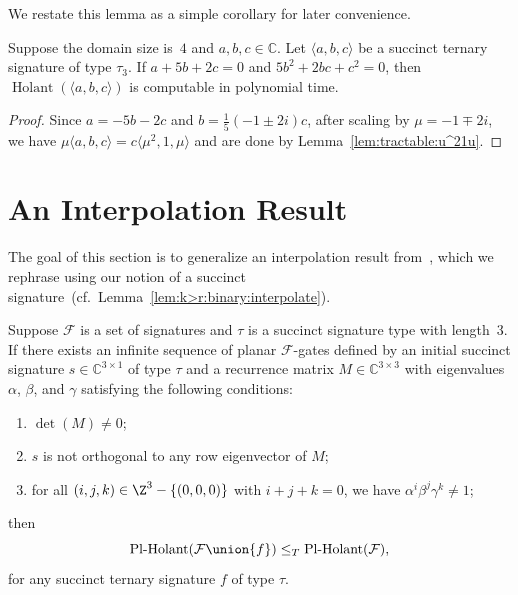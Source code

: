 \documentclass[11pt]{article}
\newcommand{\Holant}{\operatorname{Holant}}
\newcommand{\PlHolant}{\operatorname{Pl-Holant}}
\begin{document}
We restate this lemma as a simple corollary for later convenience.

\begin{corollary} \label{cor:tractable:u^21u_a+5b+2c=5b^2+2bc+c^2=0}
 Suppose the domain size is~$4$ and $a,b,c \in \mathbb{C}$.
 Let $\langle a,b,c \rangle$ be a succinct ternary signature of type $\tau_3$.
 If $a + 5 b + 2 c = 0$ and $5 b^2 + 2 b c + c^2 = 0$,
 then $\Holant(\langle a,b,c \rangle)$ is computable in polynomial time.
\end{corollary}

\begin{proof}
 Since $a = -5 b - 2 c$ and $b = \frac{1}{5} (-1 \pm 2 i) c$,
 after scaling by $\mu = -1 \mp 2 i$,
 we have $\mu \langle a,b,c \rangle = c \langle \mu^2, 1, \mu \rangle$
 and are done by Lemma~\ref{lem:tractable:u^21u}.
\end{proof}

\section{An Interpolation Result} \label{sec:interpolation}

The goal of this section is to generalize an interpolation result from~\cite{CLX12},
which we rephrase using our notion of a succinct signature~(cf.~Lemma~\ref{lem:k>r:binary:interpolate}).

\begin{theorem} \label{thm:interpolation:pervious}
 Suppose $\mathcal{F}$ is a set of signatures and $\tau$ is a succinct signature type with length~$3$.
 If there exists an infinite sequence of planar $\mathcal{F}$-gates defined by an initial succinct signature $s \in \mathbb{C}^{3 \times 1}$ of type $\tau$
 and a recurrence matrix $M \in \mathbb{C}^{3 \times 3}$ with eigenvalues $\alpha$, $\beta$, and $\gamma$ satisfying the following conditions:
 \begin{enumerate}
  \item $\det(M) \ne 0$;
  \item $s$ is not orthogonal to any row eigenvector of $M$;
  \item for all $(i,j,k) \in \Z^3 - \{(0,0,0)\}$ with $i+j+k=0$,
  we have $\alpha^i \beta^j \gamma^k \ne 1$;
 \end{enumerate}
 then
 \[
  \PlHolant(\mathcal{F} \union \{f\}) \le_T \PlHolant(\mathcal{F}),
 \]
 for any succinct ternary signature $f$ of type $\tau$.
\end{theorem}
\end{document}
